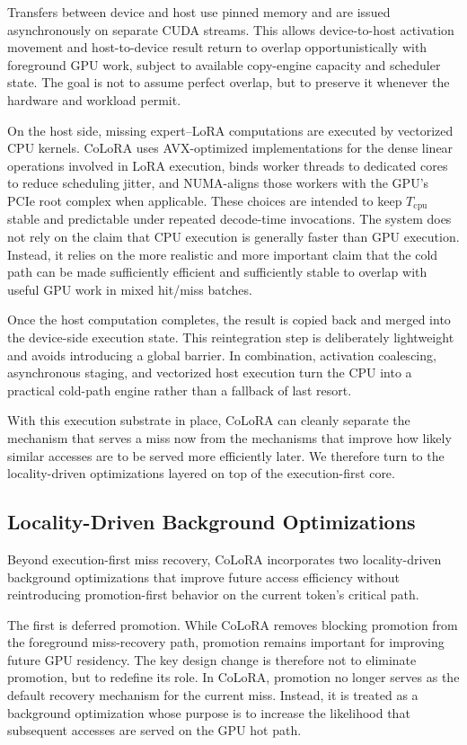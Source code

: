 \documentclass[sigplan,anonymous,review,nonacm]{acmart}
\begin{document}
Transfers between device and host use pinned memory and are issued asynchronously on separate CUDA streams. This allows device-to-host activation movement and host-to-device result return to overlap opportunistically with foreground GPU work, subject to available copy-engine capacity and scheduler state. The goal is not to assume perfect overlap, but to preserve it whenever the hardware and workload permit.

On the host side, missing expert--LoRA computations are executed by vectorized CPU kernels. CoLoRA uses AVX-optimized implementations for the dense linear operations involved in LoRA execution, binds worker threads to dedicated cores to reduce scheduling jitter, and NUMA-aligns those workers with the GPU's PCIe root complex when applicable. These choices are intended to keep $T_{\text{cpu}}$ stable and predictable under repeated decode-time invocations. The system does not rely on the claim that CPU execution is generally faster than GPU execution. Instead, it relies on the more realistic and more important claim that the cold path can be made sufficiently efficient and sufficiently stable to overlap with useful GPU work in mixed hit/miss batches.

Once the host computation completes, the result is copied back and merged into the device-side execution state. This reintegration step is deliberately lightweight and avoids introducing a global barrier. In combination, activation coalescing, asynchronous staging, and vectorized host execution turn the CPU into a practical cold-path engine rather than a fallback of last resort.

With this execution substrate in place, CoLoRA can cleanly separate the mechanism that serves a miss now from the mechanisms that improve how likely similar accesses are to be served more efficiently later. We therefore turn to the locality-driven optimizations layered on top of the execution-first core.

\subsection{Locality-Driven Background Optimizations}
\label{subsec:locality-background}

Beyond execution-first miss recovery, CoLoRA incorporates two locality-driven background optimizations that improve future access efficiency without reintroducing promotion-first behavior on the current token's critical path.

The first is deferred promotion. While CoLoRA removes blocking promotion from the foreground miss-recovery path, promotion remains important for improving future GPU residency. The key design change is therefore not to eliminate promotion, but to redefine its role. In CoLoRA, promotion no longer serves as the default recovery mechanism for the current miss. Instead, it is treated as a background optimization whose purpose is to increase the likelihood that subsequent accesses are served on the GPU hot path.
\end{document}
